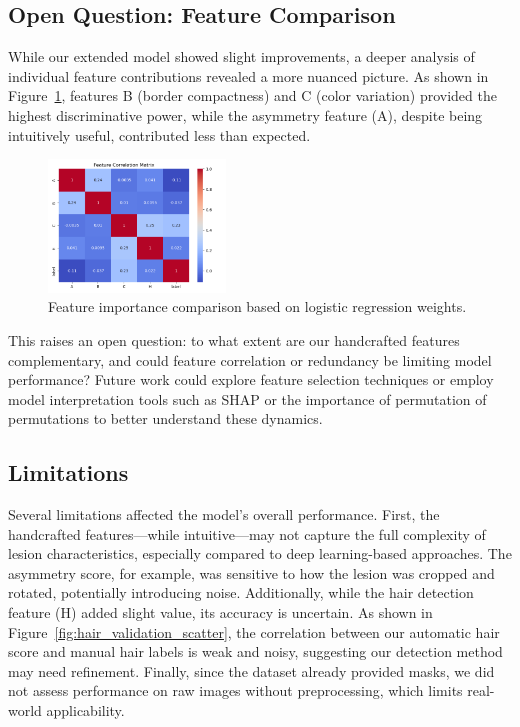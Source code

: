\documentclass[10pt,twocolumn]{article}
\begin{document}
\subsection{Open Question: Feature Comparison}
While our extended model showed slight improvements, a deeper analysis of individual feature contributions revealed a more nuanced picture. As shown in Figure~\ref{fig:feature_importance}, features B (border compactness) and C (color variation) provided the highest discriminative power, while the asymmetry feature (A), despite being intuitively useful, contributed less than expected.
\begin{figure}[ht]
\centering
\includegraphics[width=0.42\textwidth]{feature_correlation.png} 
\caption{Feature importance comparison based on logistic regression weights.}
\label{fig:feature_importance}
\end{figure}

This raises an open question: to what extent are our handcrafted features complementary, and could feature correlation or redundancy be limiting model performance? Future work could explore feature selection techniques or employ model interpretation tools such as SHAP or the importance of permutation of permutations to better understand these dynamics.
\subsection{Limitations}

Several limitations affected the model's overall performance. First, the handcrafted features—while intuitive—may not capture the full complexity of lesion characteristics, especially compared to deep learning-based approaches. The asymmetry score, for example, was sensitive to how the lesion was cropped and rotated, potentially introducing noise. Additionally, while the hair detection feature (H) added slight value, its accuracy is uncertain. As shown in Figure~\ref{fig:hair_validation_scatter}, the correlation between our automatic hair score and manual hair labels is weak and noisy, suggesting our detection method may need refinement. Finally, since the dataset already provided masks, we did not assess performance on raw images without preprocessing, which limits real-world applicability.
\end{document}
